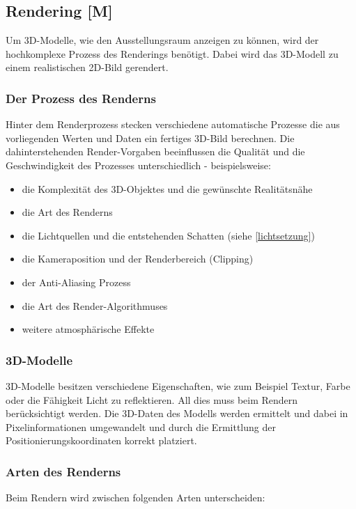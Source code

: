 \subsection{Rendering [M]} 
Um 3D-Modelle, wie den Ausstellungsraum anzeigen zu können, wird der hochkomplexe Prozess des Renderings benötigt. Dabei wird das 3D-Modell zu einem realistischen 2D-Bild gerendert. 
\cite{AdobeRendering} \cite{Rendering3DModels}

\subsubsection{Der Prozess des Renderns}
Hinter dem Renderprozess stecken verschiedene automatische Prozesse die aus vorliegenden Werten und Daten ein fertiges 3D-Bild berechnen. Die dahinterstehenden Render-Vorgaben beeinflussen die Qualität und die Geschwindigkeit des Prozesses unterschiedlich - beispielsweise:

\begin{itemize}
    \item die Komplexität des 3D-Objektes und die gewünschte Realitätsnähe
    \item die Art des Renderns
    \item die Lichtquellen und die entstehenden Schatten (siehe \ref{lichtsetzung})
    \item die Kameraposition und der Renderbereich (Clipping)
    \item der Anti-Aliasing Prozess
    \item die Art des Render-Algorithmuses
    \item weitere atmosphärische Effekte 
    
    
\end{itemize}
\cite{Rendering3DModels}

\subsubsection{3D-Modelle}
3D-Modelle besitzen verschiedene Eigenschaften, wie zum Beispiel Textur, Farbe oder die Fähigkeit Licht zu reflektieren. All dies muss beim Rendern berücksichtigt werden. Die 3D-Daten des Modells werden ermittelt und dabei in Pixelinformationen umgewandelt und durch die Ermittlung der Positionierungskoordinaten korrekt platziert.\cite{Rendering3DModels}

\subsubsection{Arten des Renderns}
Beim Rendern wird zwischen folgenden Arten unterscheiden:

